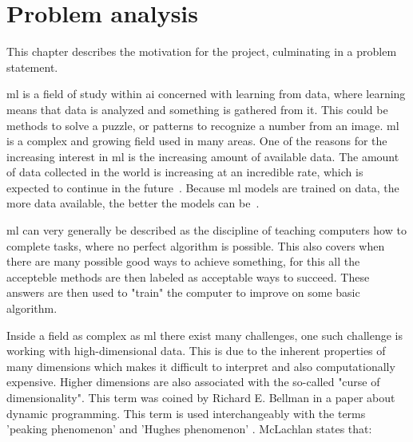 \chapter{Problem analysis}\label{cha:problem-analysis}
This chapter describes the motivation for the project, culminating in a problem statement.


\gls{ml} is a field of study within \gls{ai} concerned with learning from data, where learning means that data is analyzed and something is gathered from it. This could be methods to solve a puzzle, or patterns to recognize a number from an image. \gls{ml} is a complex and growing field used in many areas. One of the reasons for the increasing interest in \gls{ml} is the increasing amount of available data. The amount of data collected in the world is increasing at an incredible rate, which is expected to continue in the future~\cite{data-never-sleeps}. Because \gls{ml} models are trained on data, the more data available, the better the models can be~\cite{Unreasonable-effectiveness-of-data-Norvig}.

\gls{ml} can very generally be described as the discipline of teaching computers how to complete tasks, where no perfect algorithm is possible. This also covers when there are many possible good ways to achieve something, for this all the accepteble methods are then labeled as acceptable ways to succeed. These answers are then used to "train" the computer to improve on some basic algorithm\cite{alpaydin2020introduction}.

Inside a field as complex as \gls{ml} there exist many challenges, one such challenge is working with high-dimensional data. This is due to the inherent properties of many dimensions which makes it difficult to interpret and also computationally expensive. Higher dimensions are also associated with the so-called "curse of dimensionality". This term was coined by Richard E. Bellman in a paper about dynamic programming\cite{bellmanrand}. This term is used interchangeably with the terms 'peaking phenomenon' and 'Hughes phenomenon' \cite{koutroumbas2008pattern} \cite{hughes1968mean}. McLachlan states that:

